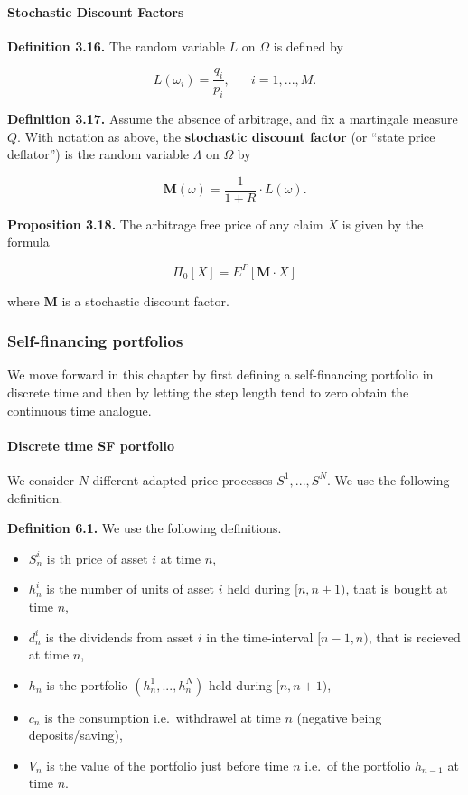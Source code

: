 \documentclass[
]{article}
\providecommand{\tightlist}{%
  \setlength{\itemsep}{0pt}\setlength{\parskip}{0pt}}
\begin{document}
\hypertarget{stochastic-discount-factors}{%
\paragraph{Stochastic Discount
Factors}\label{stochastic-discount-factors}}

\textbf{Definition 3.16.} The random variable \(L\) on \(\Omega\) is
defined by

\[
L(\omega_i)=\frac{q_i}{p_i},\hspace{20pt} i=1,...,M.
\]

\textbf{Definition 3.17.} Assume the absence of arbitrage, and fix a
martingale measure \(Q\). With notation as above, the \textbf{stochastic
discount factor} (or ``state price deflator'') is the random variable
\(\Lambda\) on \(\Omega\) by

\[
\mathbf{M}(\omega)=\frac{1}{1+R}\cdot L(\omega).\tag{3.19}
\]

\textbf{Proposition 3.18.} The arbitrage free price of any claim \(X\)
is given by the formula

\[
\Pi_0[X]=E^P[\mathbf{M}\cdot X]
\]

where \(\mathbf{M}\) is a stochastic discount factor.

\hypertarget{self-financing-portfolios}{%
\subsubsection{Self-financing
portfolios}\label{self-financing-portfolios}}

We move forward in this chapter by first defining a self-financing
portfolio in discrete time and then by letting the step length tend to
zero obtain the continuous time analogue.

\hypertarget{discrete-time-sf-portfolio}{%
\paragraph{Discrete time SF
portfolio}\label{discrete-time-sf-portfolio}}

We consider \(N\) different adapted price processes \(S^1,...,S^N\). We
use the following definition.

\textbf{Definition 6.1.} We use the following definitions.

\begin{itemize}
\tightlist
\item
  \(S_n^i\) is th price of asset \(i\) at time \(n\),
\item
  \(h_n^i\) is the number of units of asset \(i\) held during
  \([n,n+1)\), that is bought at time \(n\),
\item
  \(d_n^i\) is the dividends from asset \(i\) in the time-interval
  \([n-1,n)\), that is recieved at time \(n\),
\item
  \(h_n\) is the portfolio \((h_n^1,...,h_n^N)\) held during
  \([n,n+1)\),
\item
  \(c_n\) is the consumption i.e.~withdrawel at time \(n\) (negative
  being deposits/saving),
\item
  \(V_n\) is the value of the portfolio just before time \(n\) i.e.~of
  the portfolio \(h_{n-1}\) at time \(n\).
\end{itemize}
\end{document}
